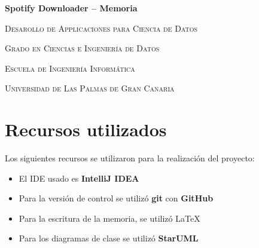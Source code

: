 \documentclass{article}
\begin{document}
\begin{titlepage}
	\centering
	{\huge\bfseries Spotify Downloader -- Memoria\par}
	\vspace{3cm}
	{\scshape\large Desarollo de Applicaciones para Ciencia de Datos\par}
	\vspace{1cm}
	{\scshape\large Grado en Ciencias e Ingeniería de Datos\par}
	\vspace{1cm}
	{\scshape\large Escuela de Ingeniería Informática\par}
	\vspace{1cm}
	{\scshape\large Universidad de Las Palmas de Gran Canaria\par}
\end{titlepage}

\newpage

\begin{abstract}

Spotify Downloader es un programa capaz de acceder al API REST de Spotify,
obtener datos sobre artistas, albums, y canciones, y guardarlos en una base de datos.
Dado la naturaleza IO del problema, es obvio de que el límite de la aplicación será 
lo rápido de que puede realizar peticiones.
Por esto el programa esta diseñado de forma de que el acceso a la API sea concurrente, mandando los valores que obtiene
a la base de datos a medida que las peticiones se completan.

Esta concurrencia se obtiene con el uso de ReactiveX\cite{rx}, más concretamente, con la librería de Java \textbf{RxJava}.
Esta librería proporciona la clase \texttt{Observer<T>} y \texttt{Observable<T>}.
En el que \texttt{Observable<T>} representa una corriente asíncrona
de valores con una interfaz monádica, permitiendo una manera sencilla de manipular y combinar estas.

\end{abstract}

\newpage

\tableofcontents

\newpage

\section{Recursos utilizados}

Los siguientes recursos se utilizaron para la realización del proyecto:

\begin{itemize}
	\item El IDE usado es \textbf{IntelliJ IDEA}\cite{ij}
	\item Para la versión de control se utilizó \textbf{git} con \textbf{GitHub}
	\item Para la escritura de la memoria, se utilizó \LaTeX{}
	\item Para los diagramas de clase se utilizó \textbf{StarUML}
\end{itemize}
\end{document}
